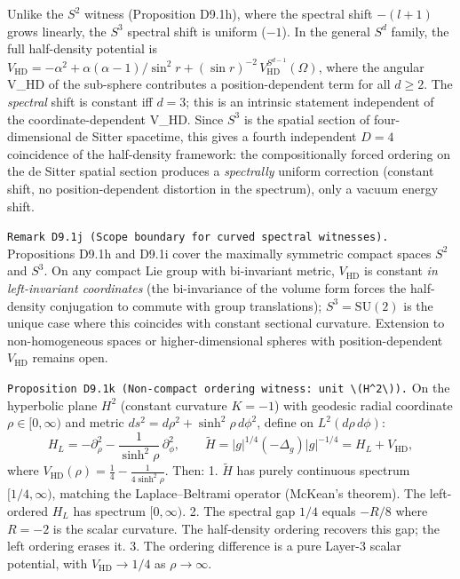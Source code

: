 \documentclass[
]{article}
\begin{document}
Unlike the \(S^2\) witness (Proposition D9.1h), where the spectral shift
\(-(l{+}1)\) grows linearly, the \(S^3\) spectral shift is uniform
(\(-1\)). In the general \(S^d\) family, the full half-density potential
is
\(V_{\mathrm{HD}}=-\alpha^2+\alpha(\alpha{-}1)/\sin^2 r + (\sin r)^{-2}\,V_{\mathrm{HD}}^{S^{d-1}}(\Omega)\),
where the angular V\_HD of the sub-sphere contributes a
position-dependent term for all \(d\ge2\). The \emph{spectral} shift is
constant iff \(d=3\); this is an intrinsic statement independent of the
coordinate-dependent V\_HD. Since \(S^3\) is the spatial section of
four-dimensional de Sitter spacetime, this gives a fourth independent
\(D=4\) coincidence of the half-density framework: the compositionally
forced ordering on the de Sitter spatial section produces a
\emph{spectrally} uniform correction (constant shift, no
position-dependent distortion in the spectrum), only a vacuum energy
shift.

\texttt{Remark\ D9.1j\ (Scope\ boundary\ for\ curved\ spectral\ witnesses).}
Propositions D9.1h and D9.1i cover the maximally symmetric compact
spaces \(S^2\) and \(S^3\). On any compact Lie group with bi-invariant
metric, \(V_{\mathrm{HD}}\) is constant \emph{in left-invariant
coordinates} (the bi-invariance of the volume form forces the
half-density conjugation to commute with group translations);
\(S^3 = \mathrm{SU}(2)\) is the unique case where this coincides with
constant sectional curvature. Extension to non-homogeneous spaces or
higher-dimensional spheres with position-dependent \(V_{\mathrm{HD}}\)
remains open.

\texttt{Proposition\ D9.1k\ (Non-compact\ ordering\ witness:\ unit\ \textbackslash{}(H\^{}2\textbackslash{})).}
On the hyperbolic plane \(H^2\) (constant curvature \(K=-1\)) with
geodesic radial coordinate \(\rho\in[0,\infty)\) and metric
\(ds^2=d\rho^2+\sinh^2\!\rho\,d\phi^2\), define on
\(L^2(d\rho\,d\phi)\): \[
H_L=-\partial_\rho^2-\frac{1}{\sinh^2\!\rho}\,\partial_\phi^2,
\qquad
\widetilde{H}=|g|^{1/4}(-\Delta_g)|g|^{-1/4}=H_L+V_{\mathrm{HD}},
\] where
\(V_{\mathrm{HD}}(\rho)=\tfrac{1}{4}-\tfrac{1}{4\sinh^2\!\rho}\). Then:
1. \(\widetilde{H}\) has purely continuous spectrum \([1/4,\infty)\),
matching the Laplace--Beltrami operator (McKean's theorem). The
left-ordered \(H_L\) has spectrum \([0,\infty)\). 2. The spectral gap
\(1/4\) equals \(-R/8\) where \(R=-2\) is the scalar curvature. The
half-density ordering recovers this gap; the left ordering erases it. 3.
The ordering difference is a pure Layer-3 scalar potential, with
\(V_{\mathrm{HD}}\to1/4\) as \(\rho\to\infty\).
\end{document}
